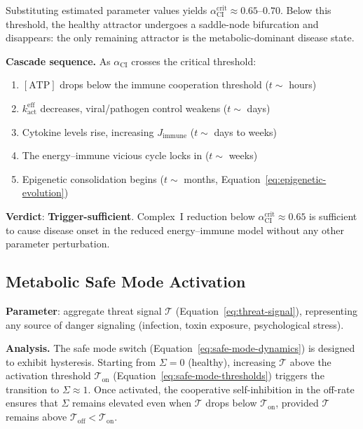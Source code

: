 Substituting estimated parameter values yields $\alpha_{\text{CI}}^{\mathrm{crit}} \approx 0.65\text{--}0.70$. Below this threshold, the healthy attractor undergoes a saddle-node bifurcation and disappears: the only remaining attractor is the metabolic-dominant disease state.

\textbf{Cascade sequence.} As $\alpha_{\text{CI}}$ crosses the critical threshold:
\begin{enumerate}
    \item $[\text{ATP}]$ drops below the immune cooperation threshold ($t \sim$ hours)
    \item $k_{\text{act}}^{\text{eff}}$ decreases, viral/pathogen control weakens ($t \sim$ days)
    \item Cytokine levels rise, increasing $J_{\text{immune}}$ ($t \sim$ days to weeks)
    \item The energy--immune vicious cycle locks in ($t \sim$ weeks)
    \item Epigenetic consolidation begins ($t \sim$ months, Equation~\ref{eq:epigenetic-evolution})
\end{enumerate}

\textbf{Verdict}: \textbf{Trigger-sufficient}. Complex~I reduction below $\alpha_{\text{CI}}^{\mathrm{crit}} \approx 0.65$ is sufficient to cause disease onset in the reduced energy--immune model without any other parameter perturbation.

\subsection{Metabolic Safe Mode Activation}
\label{sec:trigger-safe-mode}

\textbf{Parameter}: aggregate threat signal $\mathcal{T}$ (Equation~\ref{eq:threat-signal}), representing any source of danger signaling (infection, toxin exposure, psychological stress).

\textbf{Analysis.} The safe mode switch (Equation~\ref{eq:safe-mode-dynamics}) is designed to exhibit hysteresis. Starting from $\Sigma = 0$ (healthy), increasing $\mathcal{T}$ above the activation threshold $\mathcal{T}_{\text{on}}$ (Equation~\ref{eq:safe-mode-thresholds}) triggers the transition to $\Sigma \approx 1$. Once activated, the cooperative self-inhibition in the off-rate ensures that $\Sigma$ remains elevated even when $\mathcal{T}$ drops below $\mathcal{T}_{\text{on}}$, provided $\mathcal{T}$ remains above $\mathcal{T}_{\text{off}} < \mathcal{T}_{\text{on}}$.

